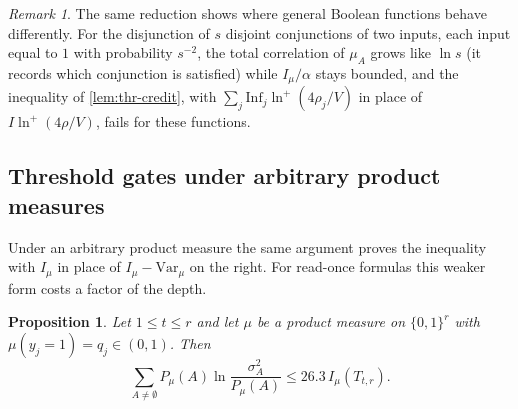 \documentclass[11pt]{amsart}
\newtheorem{proposition}[theorem]{Proposition}
\theoremstyle{definition}
\theoremstyle{remark}
\newtheorem{remark}[theorem]{Remark}
\newcommand{\Inf}{\mathrm{Inf}}
\newcommand{\Var}{\mathrm{Var}}
\newcommand{\bits}{\{0,1\}}
\begin{document}
\begin{remark}\label{rem:threshold}
The same reduction shows where general Boolean functions behave differently. For the disjunction of $s$ disjoint
conjunctions of two inputs, each input equal to $1$ with probability $s^{-2}$, the total correlation of $\mu_A$ grows
like $\ln s$ (it records which conjunction is satisfied) while $I_\mu/\alpha$ stays bounded, and the inequality of
\cref{lem:thr-credit}, with $\sum_j\Inf_j\ln^+(4\rho_j/V)$ in place of $I\ln^+(4\rho/V)$, fails for these functions.
\end{remark}

\subsection*{Threshold gates under arbitrary product measures}
Under an arbitrary product measure the same argument proves the inequality with $I_\mu$ in place of
$I_\mu-\Var_\mu$ on the right. For read-once formulas this weaker form costs a factor of the depth.

\begin{proposition}\label{prop:thr-general}
Let $1\le t\le r$ and let $\mu$ be a product measure on $\bits^r$ with $\mu(y_j=1)=q_j\in(0,1)$. Then
\[
\sum_{A\ne\emptyset}P_\mu(A)\ln\frac{\sigma_A^2}{P_\mu(A)}\le26.3\,I_\mu(T_{t,r}).
\]
\end{proposition}
\end{document}
